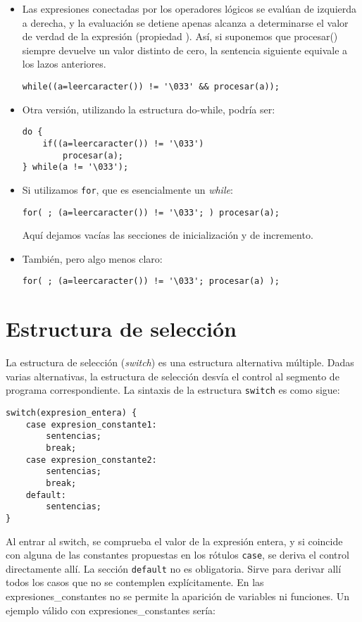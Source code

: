 \begin{ejemplo}
\begin{itemize}
\item Las expresiones conectadas por los operadores lógicos se evalúan de izquierda a
derecha, y la evaluación se detiene apenas alcanza a determinarse el valor de
verdad de la expresión (propiedad ). Así, si suponemos que
procesar() siempre devuelve un valor distinto de cero, la sentencia siguiente equivale a los lazos anteriores.

\begin{lstlisting}
while((a=leercaracter()) != '\033' && procesar(a));
\end{lstlisting}
\item Otra versión, utilizando la estructura do-while, podría ser:
\begin{lstlisting}
do {
    if((a=leercaracter()) != '\033')
        procesar(a);
} while(a != '\033');
\end{lstlisting}

\item Si utilizamos \lstinline{for}, que es esencialmente un \textit{while}:

\begin{lstlisting}
for( ; (a=leercaracter()) != '\033'; ) procesar(a);
\end{lstlisting}

Aquí dejamos vacías las secciones de inicialización y de incremento. 
\item También, pero algo menos claro:

\begin{lstlisting}
for( ; (a=leercaracter()) != '\033'; procesar(a) );
\end{lstlisting}
\end{itemize}
\end{ejemplo}

\section{Estructura de selección}

La estructura de selección (\textit{switch}) es una estructura alternativa múltiple. Dadas varias alternativas, la estructura de selección desvía el control al
segmento de programa correspondiente. La sintaxis de la estructura \lstinline{switch} es
como sigue:
\begin{lstlisting}
switch(expresion_entera) {
    case expresion_constante1:
        sentencias;
        break;
    case expresion_constante2:
        sentencias;
        break;
    default:
        sentencias;
}
\end{lstlisting}
Al entrar al switch, se comprueba el valor de la expresión entera, y si
coincide con alguna de las constantes propuestas en los rótulos \lstinline{case}, se deriva
el control directamente allí. La sección \lstinline{default} no es obligatoria. Sirve para
derivar allí todos los casos que no se contemplen explícitamente.
En las expresiones\_constantes no se permite la aparición de variables ni
funciones. Un ejemplo válido con expresiones\_constantes sería:

